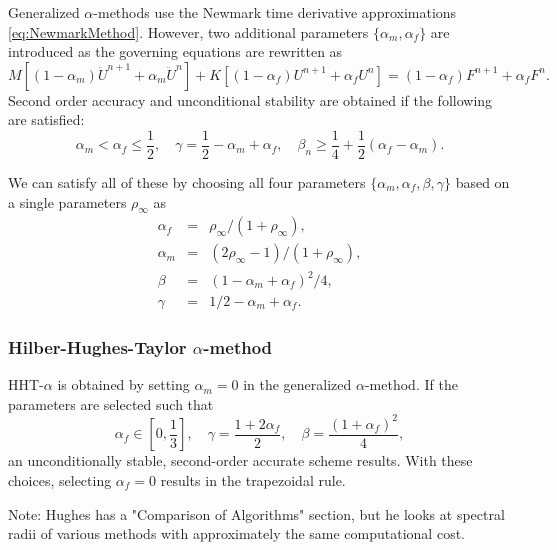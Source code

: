 \documentclass[12pt]{article}
\begin{document}
Generalized $\alpha$-methods \cite{Chung1993} use the Newmark time derivative approximations \eqref{eq:NewmarkMethod}.
However, two additional parameters $\{\alpha_m, \alpha_f\}$ are introduced as 
the governing equations are rewritten as
\begin{equation}
\label{eq:GenAlpha}
M \left[ (1-\alpha_m) \ddot{U}^{n+1} + \alpha_m \ddot{U}^n \right]
+ K \left[ (1-\alpha_f) {U}^{n+1} + \alpha_f {U}^n\right]
= (1-\alpha_f)F^{n+1} + \alpha_f F^n.
\end{equation}
Second order accuracy and unconditional stability are obtained
if the following are satisfied:
\begin{equation}
\alpha_m<\alpha_f\le \frac{1}{2}, 
\quad 
\gamma = \frac{1}{2} - \alpha_m + \alpha_f,
\quad
\beta_n \ge \frac{1}{4} + \frac{1}{2}(\alpha_f - \alpha_m).
\end{equation}

We can satisfy all of these by choosing all four parameters
$\{\alpha_m, \alpha_f, \beta, \gamma\}$ based on a single
parameters $\rho_\infty$ as
\begin{eqnarray}
\alpha_f &=& \rho_\infty/(1+\rho_\infty),
\\
\alpha_m &=& (2\rho_\infty-1)/(1+\rho_\infty),
\\
\beta &=& (1-\alpha_m+\alpha_f)^2/4,
\\
\gamma &=& 1/2 - \alpha_m + \alpha_f.
\end{eqnarray}

\subsubsection{Hilber-Hughes-Taylor $\alpha$-method}

HHT-$\alpha$ is obtained by setting $\alpha_m=0$ in the 
generalized $\alpha$-method.
If the parameters are selected such that \cite{Hughes2012}
\begin{equation}
\alpha_f \in \left[0,\frac{1}{3}\right], \quad \gamma = \frac{1+2\alpha_f}{2}, 
\quad \beta = \frac{(1+\alpha_f)^2}{4},
\end{equation}
an unconditionally stable, second-order accurate scheme results.
With these choices, selecting $\alpha_f=0$ results in the trapezoidal rule.

Note:  Hughes has a "Comparison of Algorithms" section, but he looks at
spectral radii of various methods with approximately the same computational cost.
\end{document}
